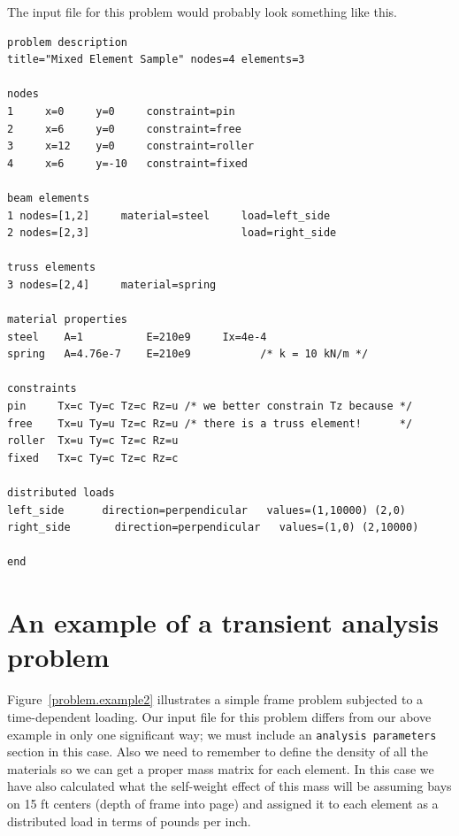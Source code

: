 The input file for this problem would probably look something like this.
\begin{screen}
 \begin{verbatim}
problem description
title="Mixed Element Sample" nodes=4 elements=3

nodes
1     x=0     y=0     constraint=pin
2     x=6     y=0     constraint=free
3     x=12    y=0     constraint=roller
4     x=6     y=-10   constraint=fixed

beam elements
1 nodes=[1,2]     material=steel     load=left_side
2 nodes=[2,3]                        load=right_side

truss elements
3 nodes=[2,4]     material=spring

material properties
steel    A=1          E=210e9     Ix=4e-4
spring   A=4.76e-7    E=210e9			/* k = 10 kN/m */

constraints
pin     Tx=c Ty=c Tz=c Rz=u	/* we better constrain Tz because */
free    Tx=u Ty=u Tz=c Rz=u	/* there is a truss element!      */ 
roller  Tx=u Ty=c Tz=c Rz=u  
fixed   Tx=c Ty=c Tz=c Rz=c  

distributed loads
left_side      direction=perpendicular   values=(1,10000) (2,0)
right_side       direction=perpendicular   values=(1,0) (2,10000)

end
 \end{verbatim}
\end{screen}

\section{An example of a transient analysis problem}
\label{problem.transient}

Figure~\ref{problem.example2} illustrates a simple frame problem subjected
to a time-dependent loading.  Our input file for this problem differs
from our above example in only one significant way;
we must include an {\tt analysis parameters} section in this case.
Also we need to remember to define the density of all the materials
so we can get a proper mass matrix for each element.  In this case
we have also calculated what the self-weight effect of this mass will
be assuming bays on 15 ft centers (depth of frame into page) and assigned 
it to each element as a distributed load in terms of pounds per inch.

